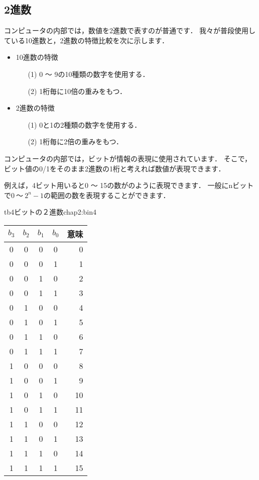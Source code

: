 \subsection{2進数}

コンピュータの内部では，数値を2進数で表すのが普通です．
我々が普段使用している10進数と，2進数の特徴比較を次に示します．

\begin{itemize}
\item 10進数の特徴
  \begin{enumerate}
  \item[(1)] 0 〜 9の10種類の数字を使用する．
  \item[(2)] 1桁毎に10倍の重みをもつ．
  \end{enumerate}
\item 2進数の特徴
  \begin{enumerate}
  \item[(1)] 0と1の2種類の数字を使用する．
  \item[(2)] 1桁毎に2倍の重みをもつ．
  \end{enumerate}
\end{itemize}

コンピュータの内部では，ビットが情報の表現に使用されています．
そこで，ビット値の0/1をそのまま2進数の1桁と考えれば数値が表現できます．

例えば，4ビット用いると0 〜 15の数がのように表現できます．
一般にnビットで$0~〜~2^n-1$の範囲の数を表現することができます．

\begin{mytable}{tb}{4ビットの２進数}{chap2:bin4}
{\small\begin{tabular}{c|c|c|c|r}
\hline\hline
$b_3$ & $b_2$ & $b_1$ & $b_0$ & 意味\\
\hline
 0 &  0 &  0 &  0 &  0 \\
 0 &  0 &  0 &  1 &  1 \\
 0 &  0 &  1 &  0 &  2 \\
 0 &  0 &  1 &  1 &  3 \\
 0 &  1 &  0 &  0 &  4 \\
 0 &  1 &  0 &  1 &  5 \\
 0 &  1 &  1 &  0 &  6 \\
 0 &  1 &  1 &  1 &  7 \\
 1 &  0 &  0 &  0 &  8 \\
 1 &  0 &  0 &  1 &  9 \\
 1 &  0 &  1 &  0 & 10 \\
 1 &  0 &  1 &  1 & 11 \\
 1 &  1 &  0 &  0 & 12 \\
 1 &  1 &  0 &  1 & 13 \\
 1 &  1 &  1 &  0 & 14 \\
 1 &  1 &  1 &  1 & 15 \\
\end{tabular}}
\end{mytable}

